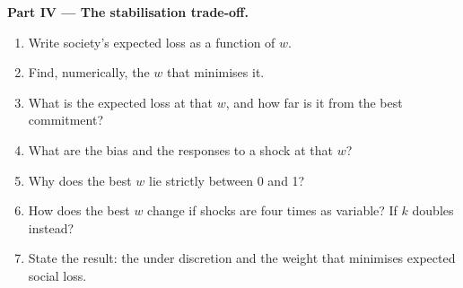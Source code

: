 \begin{problem}
\medskip
\noindent\textbf{Part IV --- The stabilisation trade-off.}
\begin{enumerate}[resume]
  \item Write society's expected loss as a function of $w$.
  \item Find, numerically, the $w$ that minimises it.
  \item What is the expected loss at that $w$, and how far is it from the best commitment?
  \item What are the bias and the responses to a shock at that $w$?
  \item Why does the best $w$ lie strictly between 0 and 1?
  \item How does the best $w$ change if shocks are four times as variable? If $k$ doubles instead?
  \item State the result: the  under discretion and the weight that minimises expected social loss.
\end{enumerate}
\end{problem}
